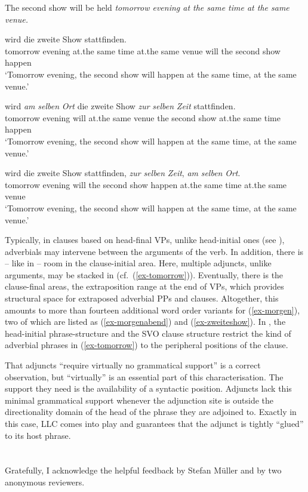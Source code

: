 \documentclass[output=paper
  ,nobabel
  ,uniformtopskip %
]{langscibook}
\begin{document}
\eal\label{ex-show}
\ex\label{ex-tomorrow}
The second show will be held \emph{tomorrow evening at the same time at the same venue.}

\ex\label{ex-morgen}
 wird die zweite Show stattfinden. \\
\spacebr{}tomorrow evening at.the same time at.the same venue will the second show happen\\
\glt `Tomorrow evening, the second show will happen at the same time, at the same venue.'

\ex\label{ex-morgenabend}
 wird \emph{am} \emph{selben} \emph{Ort} die zweite Show \emph{zur} \emph{selben} \emph{Zeit} stattfinden. \\
\spacebr{}tomorrow evening will at.the same venue the second show at.the same time happen\\
\glt `Tomorrow evening, the second show will happen at the same time, at the same venue.'

\ex\label{ex-zweiteshow}
 wird die zweite Show stattfinden, \emph{zur} \emph{selben} \emph{Zeit}, \emph{am} \emph{selben} \emph{Ort}. \\
\spacebr{}tomorrow evening will the second show happen at.the same time at.the same venue \\
\glt `Tomorrow evening, the second show will happen at the same time, at the same venue.'
\zl

\largerpage
\noindent
Typically, in clauses based on head-final VPs, unlike head-initial ones (see \citealp[12, 43]{Haider2015,Haider2010}), adverbials may intervene between the arguments of the verb. In addition, there is – like in  – room in the clause-initial area. Here, multiple adjuncts, unlike arguments, may be stacked in  (cf.\ (\ref{ex-tomorrow})).  Eventually, there is the clause-final areas, the extraposition range at the end of VPs, which provides structural space for extraposed adverbial PPs and clauses. Altogether, this amounts to more than fourteen additional word order variants for (\ref{ex-morgen}), two of which are listed as (\ref{ex-morgenabend}) and (\ref{ex-zweiteshow}). In , the head-initial phrase-structure and the SVO clause structure restrict the kind of adverbial phrases in (\ref{ex-tomorrow}) to the peripheral positions of the clause.

That adjuncts ``require virtually no grammatical support'' is a correct observation, but ``virtually'' is an essential part of this characterisation. The support they need is the availability of a syntactic position. Adjuncts lack this minimal grammatical support whenever the adjunction site is outside the directionality domain of the head of the phrase they are adjoined to. Exactly in this case, LLC comes into play and guarantees that the adjunct is tightly ``glued'' to its host phrase.



\section*{\acknowledgmentsUS}

Gratefully, I acknowledge the helpful feedback by Stefan Müller and by two anonymous reviewers. 

{\sloppy
\printbibliography[heading=subbibliography,notkeyword=this]
}
\end{document}
